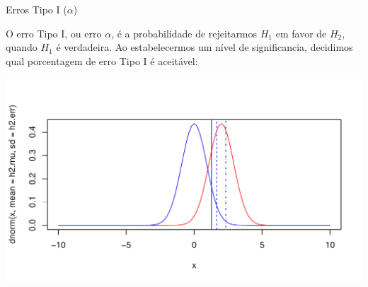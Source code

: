 \documentclass{beamer}\usepackage[]{graphicx}\usepackage[]{color}
\makeatletter
\def\maxwidth{ %
  \ifdim\Gin@nat@width>\linewidth
    \linewidth
  \else
    \Gin@nat@width
  \fi
}
\newenvironment{knitrout}{}{} %
\renewenvironment{knitrout}{\setlength{\topsep}{0mm}}{}
\makeatother
\begin{document}
\begin{frame}[fragile]{Erros Tipo I ($\alpha$)}

\small{O erro Tipo I, ou erro $\alpha$, é a probabilidade de rejeitarmos $H_1$ em favor de $H_2$, quando $H_1$ é verdadeira. Ao estabelecermos um nível de significancia, decidimos qual porcentagem de erro Tipo I é aceitável:}

\begin{knitrout}\tiny
{}\color{fgcolor}
\includegraphics[width=\maxwidth]{figure/erro3-1} 

\end{knitrout}


\end{frame}
\end{document}
